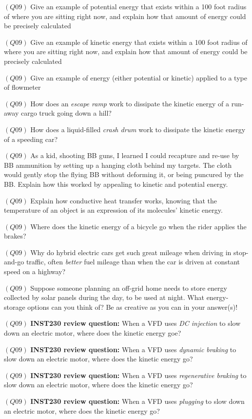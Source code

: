 \medskip
\item{$(Q09)$} Give an example of potential energy that exists within a 100 foot radius of where you are sitting right now, and explain how that amount of energy could be precisely calculated
\item{$(Q09)$} Give an example of kinetic energy that exists within a 100 foot radius of where you are sitting right now, and explain how that amount of energy could be precisely calculated
\item{$(Q09)$} Give an example of energy (either potential or kinetic) applied to a type of flowmeter
\item{$(Q09)$} How does an {\it escape ramp} work to dissipate the kinetic energy of a run-away cargo truck going down a hill?
\item{$(Q09)$} How does a liquid-filled {\it crash drum} work to dissipate the kinetic energy of a speeding car?
\item{$(Q09)$} As a kid, shooting BB guns, I learned I could recapture and re-use by BB ammunition by setting up a hanging cloth behind my targets.  The cloth would gently stop the flying BB without deforming it, or being puncured by the BB.  Explain how this worked by appealing to kinetic and potential energy.
\item{$(Q09)$} Explain how conductive heat transfer works, knowing that the temperature of an object is an expression of its molecules' kinetic energy.
\item{$(Q09)$} Where does the kinetic energy of a bicycle go when the rider applies the brakes?
\item{$(Q09)$} Why do hybrid electric cars get such great mileage when driving in stop-and-go traffic, often {\it better} fuel mileage than when the car is driven at constant speed on a highway?
\item{$(Q09)$} Suppose someone planning an off-grid home needs to store energy collected by solar panels during the day, to be used at night.  What energy-storage options can you think of?  Be as creative as you can in your answer(s)!
\item{$(Q09)$} {\bf INST230 review question:} When a VFD uses {\it DC injection} to slow down an electric motor, where does the kinetic energy goe?
\item{$(Q09)$} {\bf INST230 review question:} When a VFD uses {\it dynamic braking} to slow down an electric motor, where does the kinetic energy go?
\item{$(Q09)$} {\bf INST230 review question:} When a VFD uses {\it regenerative braking} to slow down an electric motor, where does the kinetic energy go?
\item{$(Q09)$} {\bf INST230 review question:} When a VFD uses {\it plugging} to slow down an electric motor, where does the kinetic energy go?
\medskip


